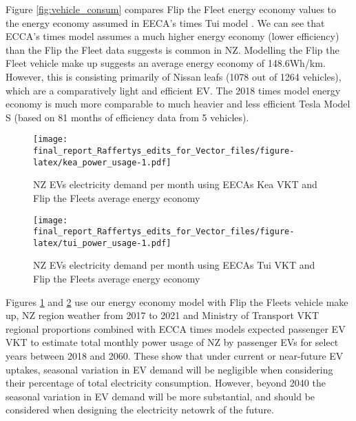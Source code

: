 \documentclass[
]{article}
\begin{document}
Figure \ref{fig:vehicle_consum} compares Flip the Fleet energy economy
values to the energy economy assumed in EECA's times Tui model
\cite{times_model}. We can see that ECCA's times model assumes a much
higher energy economy (lower efficiency) than the Flip the Fleet data
suggests is common in NZ. Modelling the Flip the Fleet vehicle make up
suggests an average energy economy of 148.6Wh/km. However, this is
consisting primarily of Nissan leafs (1078 out of 1264 vehicles), which
are a comparatively light and efficient EV. The 2018 times model energy
economy is much more comparable to much heavier and less efficient Tesla
Model S (based on 81 months of efficiency data from 5 vehicles).

\begin{figure}
\centering
\texttt{[image: final\_report\_Raffertys\_edits\_for\_Vector\_files/figure-latex/kea\_power\_usage-1.pdf]}
\caption{NZ EVs electricity demand per month using EECAs Kea VKT and
Flip the Fleets average energy economy\label{fig:kea_power_usage}}
\end{figure}

\begin{figure}
\centering
\texttt{[image: final\_report\_Raffertys\_edits\_for\_Vector\_files/figure-latex/tui\_power\_usage-1.pdf]}
\caption{NZ EVs electricity demand per month using EECAs Tui VKT and
Flip the Fleets average energy economy\label{fig:tui_power_usage}}
\end{figure}

Figures \ref{fig:kea_power_usage} and \ref{fig:tui_power_usage} use our
energy economy model with Flip the Fleets vehicle make up, NZ region
weather from 2017 to 2021 and Ministry of Transport VKT regional
proportions combined with ECCA times models expected passenger EV VKT to
estimate total monthly power usage of NZ by passenger EVs for select
years between 2018 and 2060. These show that under current or
near-future EV uptakes, seasonal variation in EV demand will be
negligible when considering their percentage of total electricity
consumption. However, beyond 2040 the seasonal variation in EV demand
will be more substantial, and should be considered when designing the
electricity netowrk of the future.
\end{document}
